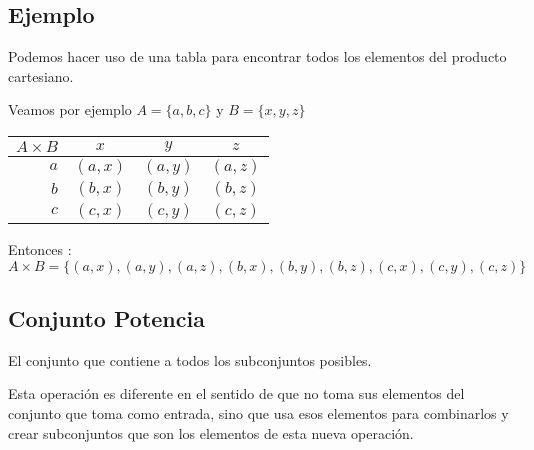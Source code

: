 \documentclass[12pt]{report}                                    %
\begin{document}
            \clearpage
            \subsection*{Ejemplo}

                Podemos hacer uso de una tabla para encontrar todos los elementos del producto
                cartesiano.

                Veamos por ejemplo $A = \{a, b, c\}$ y $B = \{ x, y, z\}$

                \begin{tabular}{r ||c |c | c  }
                   $A \times B$ & $x$ & $y$ & $z$ \\
                   \midrule
                  
                   $a$ &  $(a, x)$  &  $(a, y)$  &  $(a, z)$  \\
                   $b$ &  $(b, x)$  &  $(b, y)$  &  $(b, z)$  \\
                   $c$ &  $(c, x)$  &  $(c, y)$  &  $(c, z)$  \\
                 
                \end{tabular}

                Entonces : 
                \begin{equation*}
                    A \times B = 
                    \{
                        (a, x) , (a, y) , (a, z) ,
                        (b, x) , (b, y) , (b, z) ,
                        (c, x) , (c, y) , (c, z) 
                    \}
                \end{equation*}



        \clearpage
        \subsection{Conjunto Potencia}

            El conjunto que contiene a todos los subconjuntos posibles. 

            Esta operación es diferente en el sentido de que no toma sus elementos del conjunto
            que toma como entrada, sino que usa esos elementos para combinarlos y crear subconjuntos
            que son los elementos de esta nueva operación.
\end{document}
